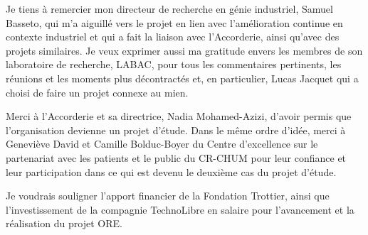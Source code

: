 %

%

Je tiens à remercier mon directeur de recherche en génie industriel, Samuel Basseto, qui m'a aiguillé vers le projet en lien avec l'amélioration continue en contexte industriel et qui a fait la liaison avec l'Accorderie, ainsi qu'avec des projets similaires. Je veux exprimer aussi ma gratitude envers les membres de son laboratoire de recherche, LABAC, pour tous les commentaires pertinents, les réunions et les moments plus décontractés et, en particulier, Lucas Jacquet qui a choisi de faire un projet connexe au mien.

Merci à l'Accorderie et sa directrice, Nadia Mohamed-Azizi, d'avoir permis que l'organisation devienne un projet d'étude. Dans le même ordre d'idée, merci à Geneviève David et Camille Bolduc-Boyer du Centre d'excellence sur le partenariat avec les patients et le public du CR-CHUM pour leur confiance et leur participation dans ce qui est devenu le deuxième cas du projet d'étude.

Je voudrais souligner l'apport financier de la Fondation Trottier, ainsi que l'investissement de la compagnie TechnoLibre en salaire pour l'avancement et la réalisation du projet ORE.

